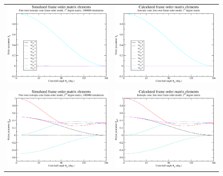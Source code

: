 \begin{figure}
\centering
  \begin{tabular}{@{}cc@{}}
    \includegraphics[width=.5\textwidth]{images/frame_order_matrix/Sij_iso_cone_free_rotor_in_frame_theta_x_ens1000000.eps} &
    \includegraphics[width=.5\textwidth]{images/frame_order_matrix/Sij_iso_cone_free_rotor_in_frame_theta_x_calc.eps} \\
    \\[-5pt]
    \includegraphics[width=.5\textwidth]{images/frame_order_matrix/Sijkl_iso_cone_free_rotor_in_frame_theta_x_ens1000000.eps} &
    \includegraphics[width=.5\textwidth]{images/frame_order_matrix/Sijkl_iso_cone_free_rotor_in_frame_theta_x_calc.eps} \\

\end{tabular}
\end{figure}
